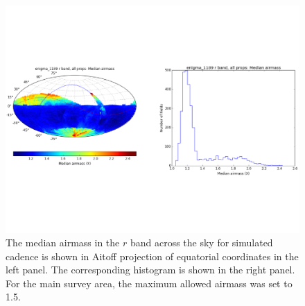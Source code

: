 \begin{figure}[tbh!]
\vskip -1.3in
\includegraphics[angle=0,width=0.99\hsize:,clip]{figs/enigma1189_airmass.pdf}
\vskip -1.3in
\caption{The median airmass in the $r$ band across the sky for simulated cadence
 is shown in Aitoff
projection of equatorial coordinates in the left panel. The corresponding histogram is
shown in the right panel. For the main survey area, the maximum allowed airmass
was set to 1.5. }
\label{fig:airmassenigma}
\end{figure}

